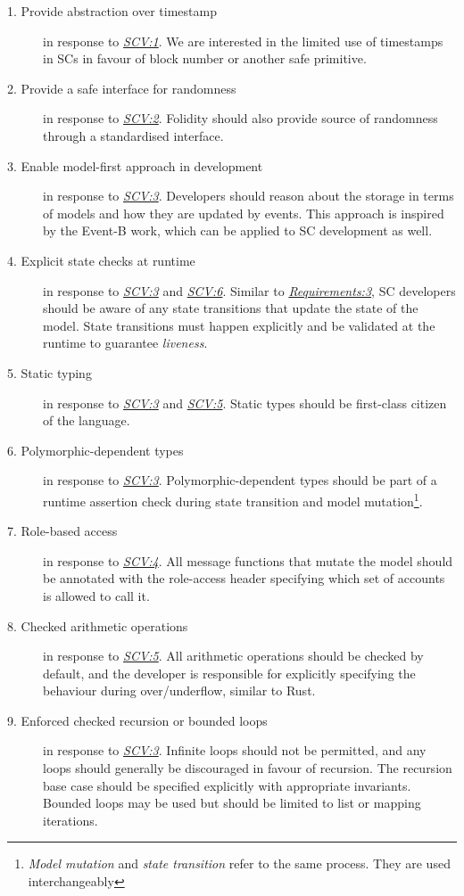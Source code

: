 \documentclass[oneside]{ecsproject}     %
\newcommand{\vref}[1]{\textit{\hyperref[#1]{#1}}}
\newcommand{\rref}[1]{\textit{\hyperref[#1]{#1}}}
\begin{document}
\begin{description}
  \item[1. Provide abstraction over timestamp]\label{Requirements:1} in response to \vref{SCV:1}. We are interested in the limited use of timestamps in SCs in favour of block number or another safe primitive.
  \item[2. Provide a safe interface for randomness]\label{Requirements:2} in response to \vref{SCV:2}. Folidity should also provide source of randomness through a standardised interface.
  \item[3. Enable model-first approach in development]\label{Requirements:3} in response to \vref{SCV:3}. Developers should reason about the storage in terms of models and how they are updated by events. 
This approach is inspired by the Event-B\cite{event_b} work, which can be applied to SC development as well.
  \item[4. Explicit state checks at runtime]\label{Requirements:4} in response to \vref{SCV:3} and \vref{SCV:6}. Similar to \rref{Requirements:3}, SC developers should be aware of any state transitions
that update the state of the model. State transitions must happen explicitly and be validated at the runtime to guarantee \textit{liveness}.
  \item[5. Static typing]\label{Requirements:5} in response to \vref{SCV:3} and \vref{SCV:5}. Static types should be first-class citizen of the language.
  \item[6. Polymorphic-dependent types]\label{Requirements:6} in response to \vref{SCV:3}. Polymorphic-dependent types should be part of a runtime assertion check 
during state transition and model mutation\footnote{\textit{Model mutation} and \textit{state transition} refer to the same process. They are used interchangeably}.
  \item[7. Role-based access]\label{Requirements: 7} in response to \vref{SCV:4}. 
All message functions that mutate the model should be annotated with the role-access header specifying which set of accounts is allowed to call it.
  \item[8. Checked arithmetic operations]\label{Requirements:8} in response to \vref{SCV:5}. 
All arithmetic operations should be checked by default, and the developer is responsible for explicitly specifying the behaviour during over/underflow, similar to Rust.
  \item[9. Enforced checked recursion or bounded loops]\label{Requirements:9} in response to \vref{SCV:3}.
Infinite loops should not be permitted, and any loops should generally be discouraged in favour of recursion. The recursion base case should be specified explicitly with appropriate invariants.
Bounded loops may be used but should be limited to list or mapping iterations.
\end{description}
\end{document}
